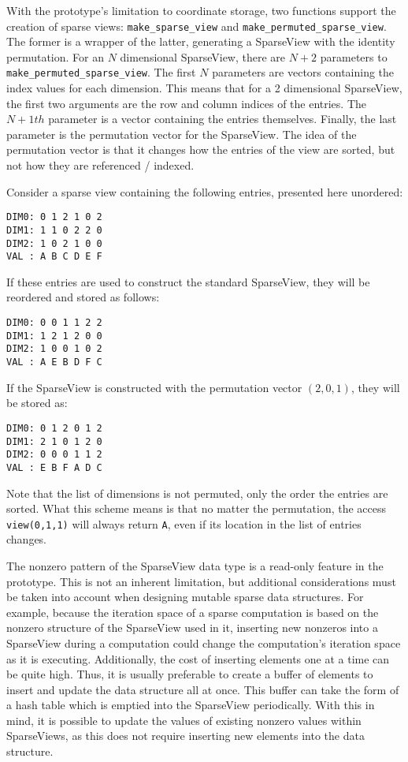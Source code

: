 With the prototype's limitation to coordinate storage, two functions support the creation of sparse views: \verb.make_sparse_view. and \verb.make_permuted_sparse_view..
The former is a wrapper of the latter, generating a SparseView with the identity permutation.
For an $N$ dimensional SparseView, there are $N+2$ parameters to \verb.make_permuted_sparse_view..
The first $N$ parameters are vectors containing the index values for each dimension. 
This means that for a 2 dimensional SparseView, the first two arguments are the row and column indices of the entries.
The $N+1th$ parameter is a vector containing the entries themselves. 
Finally, the last parameter is the permutation vector for the SparseView. 
The idea of the permutation vector is that it changes how the entries of the view are sorted, but not how they are referenced / indexed.

Consider a sparse view containing the following entries, presented here unordered:
\begin{lstlisting}
DIM0: 0 1 2 1 0 2
DIM1: 1 1 0 2 2 0
DIM2: 1 0 2 1 0 0
VAL : A B C D E F 
\end{lstlisting}
If these entries are used to construct the standard SparseView, they will be reordered and stored as follows:
\begin{lstlisting}
DIM0: 0 0 1 1 2 2
DIM1: 1 2 1 2 0 0
DIM2: 1 0 0 1 0 2
VAL : A E B D F C
\end{lstlisting}
If the SparseView is constructed with the permutation vector $(2,0,1)$, they will be stored as:
\begin{lstlisting}
DIM0: 0 1 2 0 1 2
DIM1: 2 1 0 1 2 0
DIM2: 0 0 0 1 1 2
VAL : E B F A D C
\end{lstlisting}
Note that the list of dimensions is not permuted, only the order the entries are sorted. 
What this scheme means is that no matter the permutation, the access \verb.view(0,1,1). will always return \verb.A., even if its location in the list of entries changes.

The nonzero pattern of the SparseView data type is a read-only feature in the prototype.
This is not an inherent limitation, but additional considerations must be taken into account when designing mutable sparse data structures.
For example, because the iteration space of a sparse computation is based on the nonzero structure of the SparseView used in it, inserting new nonzeros into a SparseView during a computation could change the computation's iteration space as it is executing.
Additionally, the cost of inserting elements one at a time can be quite high. 
Thus, it is usually preferable to create a buffer of elements to insert and update the data structure all at once.
This buffer can take the form of a hash table which is emptied into the SparseView periodically.
With this in mind, it is possible to update the values of existing nonzero values within SparseViews, as this does not require inserting new elements into the data structure.

